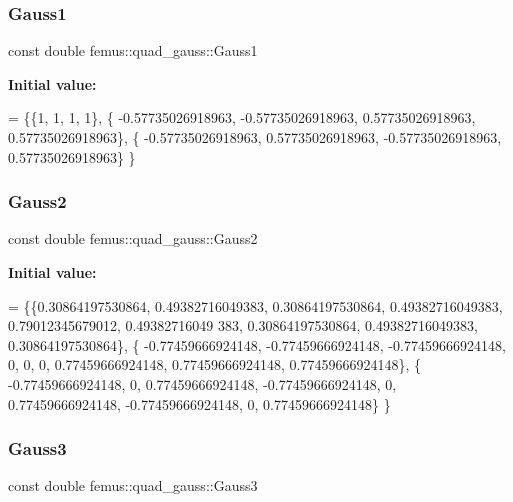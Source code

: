 \subsubsection{\texorpdfstring{Gauss1}{Gauss1}}
{\footnotesize\ttfamily const double femus\+::quad\+\_\+gauss\+::\+Gauss1\hspace{0.3cm}{\ttfamily [static]}}

{\bfseries Initial value\+:}
\begin{DoxyCode}
= \{\{1, 1, 1, 1\},
    \{ -0.57735026918963, -0.57735026918963, 0.57735026918963, 0.57735026918963\},
    \{ -0.57735026918963, 0.57735026918963, -0.57735026918963, 0.57735026918963\}
  \}
\end{DoxyCode}
\mbox{\label{classfemus_1_1quad__gauss_af8054c34e7f8111ea4e3859ad1dd37be}} 
\subsubsection{\texorpdfstring{Gauss2}{Gauss2}}
{\footnotesize\ttfamily const double femus\+::quad\+\_\+gauss\+::\+Gauss2\hspace{0.3cm}{\ttfamily [static]}}

{\bfseries Initial value\+:}
\begin{DoxyCode}
= \{\{0.30864197530864, 0.49382716049383, 0.30864197530864, 0.49382716049383, 0.79012345679012, 0.49382716049
      383, 0.30864197530864, 0.49382716049383, 0.30864197530864\},
    \{ -0.77459666924148, -0.77459666924148, -0.77459666924148, 0, 0, 0, 0.77459666924148, 0.77459666924148,
       0.77459666924148\},
    \{ -0.77459666924148, 0, 0.77459666924148, -0.77459666924148, 0, 0.77459666924148, -0.77459666924148, 0,
       0.77459666924148\}
  \}
\end{DoxyCode}
\mbox{\label{classfemus_1_1quad__gauss_aff0fd84125a9e72c322ec52307acb56f}} 
\subsubsection{\texorpdfstring{Gauss3}{Gauss3}}
{\footnotesize\ttfamily const double femus\+::quad\+\_\+gauss\+::\+Gauss3\hspace{0.3cm}{\ttfamily [static]}}

